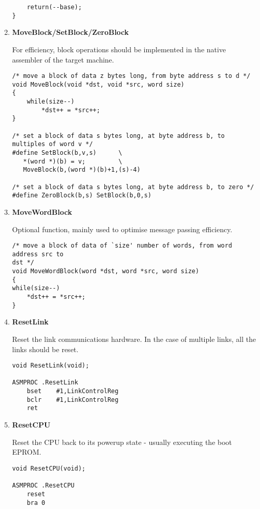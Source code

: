 \begin{enumerate}
\begin{verbatim}
    return(--base);
}
\end{verbatim}
\normalsize

\item {\bf MoveBlock/SetBlock/ZeroBlock}

For efficiency, block operations should be implemented in the native
assembler of the target machine.
\scriptsize
\begin{verbatim}
/* move a block of data z bytes long, from byte address s to d */
void MoveBlock(void *dst, void *src, word size)
{
    while(size--)
        *dst++ = *src++;
}

/* set a block of data s bytes long, at byte address b, to multiples of word v */
#define SetBlock(b,v,s)      \
   *(word *)(b) = v;         \
   MoveBlock(b,(word *)(b)+1,(s)-4)

/* set a block of data s bytes long, at byte address b, to zero */
#define ZeroBlock(b,s) SetBlock(b,0,s)
\end{verbatim}
\normalsize

\item {\bf MoveWordBlock}

Optional function, mainly used to optimise message passing efficiency.
\scriptsize
\begin{verbatim}
/* move a block of data of `size' number of words, from word address src to 
dst */
void MoveWordBlock(word *dst, word *src, word size)
{
while(size--)
    *dst++ = *src++;
}
\end{verbatim}
\normalsize

\item {\bf ResetLink}

Reset the link communications hardware.
In the case of multiple links, all the links should be reset.

\scriptsize
\begin{verbatim}
void ResetLink(void);

ASMPROC .ResetLink
    bset    #1,LinkControlReg
    bclr    #1,LinkControlReg
    ret
\end{verbatim}
\normalsize

\item {\bf ResetCPU}

Reset the CPU back to its powerup state - usually executing the boot EPROM.

\scriptsize
\begin{verbatim}
void ResetCPU(void);

ASMPROC .ResetCPU
    reset
    bra 0
\end{verbatim}
\normalsize


\end{enumerate}
